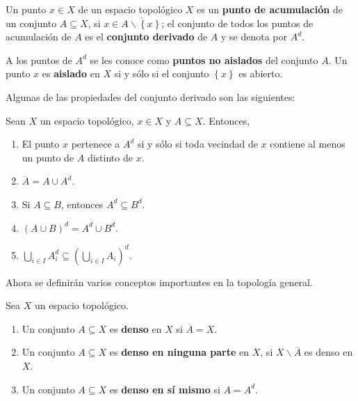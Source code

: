 \documentclass[12pt]{report}
\theoremstyle{largebreak}
\renewcommand{\theenumi}{\arabic{enumi})}
\begin{document}
    \begin{mydef}
        Un punto $x\in X$ de un espacio topológico $X$ es un \textbf{punto de acumulación} de un conjunto $A\subseteq X$, si $x\in\overline{A\backslash\left\{x\right\}}$; el conjunto de todos los puntos de acumulación de $A$ es el \textbf{conjunto derivado} de $A$ y se denota por $A^d$.

        A los puntos de $A^d$ se les conoce como \textbf{puntos no aislados} del conjunto $A$. Un punto $x$ es \textbf{aislado} en $X$ si y sólo si el conjunto $\left\{x\right\}$ es abierto.
    \end{mydef}

    Algunas de las propiedades del conjunto derivado son las siguientes:

    \begin{propo}
        Sean $X$ un espacio topológico, $x\in X$ y $A\subseteq X$. Entonces,
        \renewcommand{\theenumi}{D\arabic{enumi})}
        \begin{enumerate}
            \item El punto $x$ pertenece a $A^d$ si y sólo si toda vecindad de $x$ contiene al menos un punto de $A$ distinto de $x$.
            \item $\overline{A}=A\cup A^d$.
            \item Si $A\subseteq B$, entonces $A^d\subseteq B^d$.
            \item $(A\cup B)^d=A^d\cup B^d$.
            \item $\bigcup_{i\in I} A_i^d\subseteq \left(\bigcup_{i\in I}A_i\right)^d$.
        \end{enumerate}
    \end{propo}

    Ahora se definirán varios conceptos importantes en la topología general.

    \begin{mydef}
        Sea $X$ un espacio topológico.
        \renewcommand{\theenumi}{\arabic{enumi})}
        \begin{enumerate}
            \item Un conjunto $A\subseteq X$ es \textbf{denso} en $X$ si $\overline{A}=X$.
            \item Un conjunto $A\subseteq X$ es \textbf{denso en ninguna parte} en $X$, si $X\backslash \overline{A}$ es denso en $X$.
            \item Un conjunto $A\subseteq X$ es \textbf{denso en sí mismo} si $A=A^d$.
        \end{enumerate}
    \end{mydef}
\end{document}
